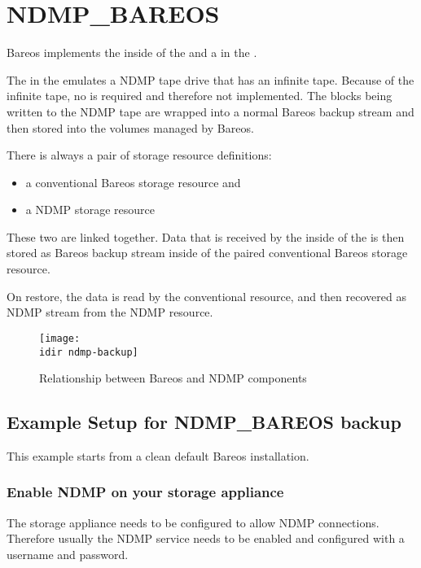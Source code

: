 \section{NDMP\_BAREOS}
\label{sec:NdmpBareos}

Bareos implements the \DataManagementAgent inside of the \bareosDir
and a \TapeAgent in the \bareosSd.

The \TapeAgent in the \bareosSd emulates a NDMP tape drive that has an infinite tape.
Because of the infinite tape, no \RobotAgent is required and therefore not implemented.
The blocks being written to the NDMP tape are wrapped into a normal Bareos backup stream
and then stored into the volumes managed by Bareos.

There is always a pair of storage resource definitions:
\begin{itemize}
    \item a conventional Bareos storage resource and
    \item a NDMP storage resource
\end{itemize}

These two are linked together.
Data that is received by the \TapeAgent inside of the \bareosSd is then stored as Bareos backup stream inside of the paired conventional Bareos storage resource.

On restore, the data is read by the conventional resource, and then recovered as NDMP stream from the NDMP resource.

\begin{figure}[htbp]
\centering
\texttt{[image: \\idir ndmp-backup]}
\caption{Relationship between Bareos and NDMP components}
\end{figure}%


\subsection{Example Setup for NDMP\_BAREOS backup}

This example starts from a clean default Bareos installation.

\subsubsection{Enable NDMP on your storage appliance}

The storage appliance needs to be configured to allow NDMP connections. Therefore  usually the
NDMP service needs to be enabled and configured with a username and password.

